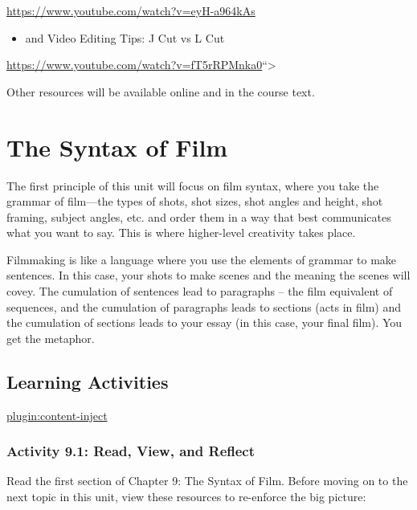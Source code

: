 \documentclass[
]{book}
\providecommand{\tightlist}{%
  \setlength{\itemsep}{0pt}\setlength{\parskip}{0pt}}
\begin{document}
\url{https://www.youtube.com/watch?v=eyH-a964kAs}

\begin{itemize}
\tightlist
\item
  and Video Editing Tips: J Cut vs L Cut
\end{itemize}

\url{https://www.youtube.com/watch?v=fT5rRPMnka0}``\textgreater{}

Other resources will be available online and in the course text.

\hypertarget{the-syntax-of-film}{%
\section*{The Syntax of Film}\label{the-syntax-of-film}}

The first principle of this unit will focus on film syntax, where you take the grammar of film---the types of shots, shot sizes, shot angles and height, shot framing, subject angles, etc. and order them in a way that best communicates what you want to say. This is where higher-level creativity takes place.

Filmmaking is like a language where you use the elements of grammar to make sentences. In this case, your shots to make scenes and the meaning the scenes will covey. The cumulation of sentences lead to paragraphs -- the film equivalent of sequences, and the cumulation of paragraphs leads to sections (acts in film) and the cumulation of sections leads to your essay (in this case, your final film). You get the metaphor.

\hypertarget{learning-activities-35}{%
\subsection*{Learning Activities}\label{learning-activities-35}}

\href{../_9-1}{plugin:content-inject}

\hypertarget{activity-9.1-read-view-and-reflect}{%
\subsubsection*{Activity 9.1: Read, View, and Reflect}\label{activity-9.1-read-view-and-reflect}}

Read the first section of Chapter 9: The Syntax of Film. Before moving on to the next topic in this unit, view these resources to re-enforce the big picture:
\end{document}
